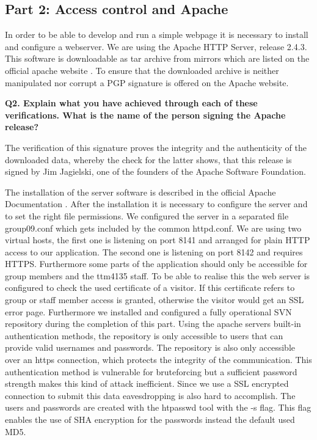 \subsection {Part 2: Access control and Apache}


\noindent
In order to be able to develop and run a simple webpage it is necessary to install and configure a webserver. 
We are using  the Apache HTTP Server, release 2.4.3. This software is downloadable as tar archive from mirrors 
which are listed on the official apache website \cite{quelle1}. To ensure that the downloaded archive is neither manipulated 
nor corrupt a PGP signature is offered on the Apache website. 
\newline

\noindent
{\bf Q2. Explain what you have achieved through each of these verifications.
What is the name of the person signing the Apache release?}
\newline

\noindent
The verification of this signature proves the integrity and the authenticity of the downloaded data, 
whereby the check for the latter shows, that this release is signed by Jim Jagielski, 
one of the founders of the Apache Software Foundation. 
\newline

\noindent
The installation of the server software is described in the official Apache Documentation \cite{quelle2}.
After the installation it is necessary to configure the server and to set the right file permissions. 
We configured the server in a separated file group09.conf which gets included by the common httpd.conf. 
We are using two virtual hosts, the first one is listening on port 8141 and arranged for plain HTTP access to our application.
The second one is listening on port 8142 and requires HTTPS. 
Furthermore some parts of the application should only be accessible for group members and the ttm4135 staff. To be able to realise this 
the web server is configured to check the used certificate of a visitor. 
If this certificate refers to group or staff member access is granted, 
otherwise the visitor would get an SSL error page. 
\newline
\noindent
Furthermore we installed and configured a fully operational SVN repository during the completion of this part.
Using the apache servers built-in authentication methods, the repository is only accessible to users that can provide valid usernames and passwords. The repository is also only accessible over an https connection, which protects the integrity of the communication. This authentication method is vulnerable for bruteforcing but a sufficient password strength makes this kind of attack inefficient. Since we use a SSL encrypted connection to submit this data eavesdropping is also hard to accomplish. The users and passwords are created with the htpasswd tool with the -s flag. This flag enables the use of SHA encryption for the passwords instead the default used MD5.
\newline

